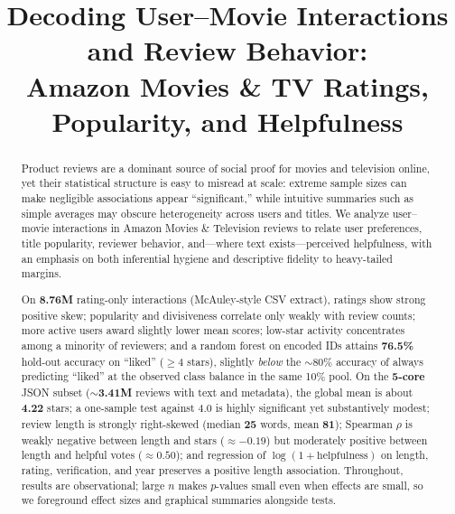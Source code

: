 \documentclass[conference]{IEEEtran}
\begin{document}
\title{Decoding User--Movie Interactions and Review Behavior:\\ Amazon Movies \& TV Ratings, Popularity, and Helpfulness}

\author{
}

\maketitle

\begin{abstract}
Product reviews are a dominant source of social proof for movies and television online, yet their statistical structure is easy to misread at scale: extreme sample sizes can make negligible associations appear ``significant,'' while intuitive summaries such as simple averages may obscure heterogeneity across users and titles. We analyze user--movie interactions in Amazon Movies \& Television reviews to relate user preferences, title popularity, reviewer behavior, and---where text exists---perceived helpfulness, with an emphasis on both inferential hygiene and descriptive fidelity to heavy-tailed margins.

On \textbf{8.76M} rating-only interactions (McAuley-style CSV extract), ratings show strong positive skew; popularity and divisiveness correlate only weakly with review counts; more active users award slightly lower mean scores; low-star activity concentrates among a minority of reviewers; and a random forest on encoded IDs attains \textbf{76.5\%} hold-out accuracy on ``liked'' ($\geq 4$ stars), slightly \emph{below} the $\sim$80\% accuracy of always predicting ``liked'' at the observed class balance in the same 10\% pool. On the \textbf{5-core} JSON subset (\textbf{$\sim$3.41M} reviews with text and metadata), the global mean is about \textbf{4.22} stars; a one-sample test against $4.0$ is highly significant yet substantively modest; review length is strongly right-skewed (median \textbf{25} words, mean \textbf{81}); Spearman $\rho$ is weakly negative between length and stars ($\approx -0.19$) but moderately positive between length and helpful votes ($\approx 0.50$); and regression of $\log(1+\text{helpfulness})$ on length, rating, verification, and year preserves a positive length association. Throughout, results are observational; large $n$ makes $p$-values small even when effects are small, so we foreground effect sizes and graphical summaries alongside tests.
\end{abstract}
\end{document}
